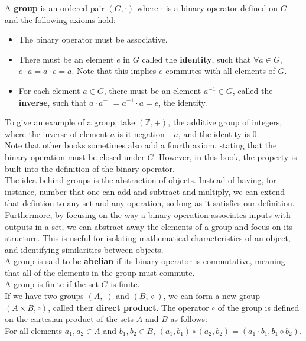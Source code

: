 \documentclass[12pt]{article}
\newcommand{\Z}{\mathbb{Z}}
\begin{document}
    A \textbf{group} is an ordered pair $(G, \cdot)$
    where $\cdot$ is a binary operator defined on $G$
    and the following axioms hold:
    \begin{itemize}[label=$\diamond$]
        \item 
            The binary operator must be associative.
        \item 
            There must be an element $e$ in $G$ called the \textbf{identity},
            such that $\forall a \in G$,
            $e \cdot a = a \cdot e = a$.
            Note that this implies $e$ commutes with all elements of $G$.
        \item
            For each element $a \in G$,
            there must be an element $a^{-1} \in G$,
            called the \textbf{inverse},
            such that $a \cdot a^{-1} = a^{-1} \cdot a = e$,
            the identity.
    \end{itemize}
    To give an example of a group,
    take $(\Z, +)$,
    the additive group of integers,
    where the inverse of element $a$ is it negation $-a$,
    and the identity is $0$. \\ 
    Note that other books sometimes also add a fourth axiom,
    stating that the binary operation must be closed under $G$.
    However, in this book, the property is built into the definition
    of the binary operator. \\

    The idea behind groups is the abstraction of objects.
    Instead of having, for instance,
    number that one can add and subtract and multiply,
    we can extend that defintion to any set and any operation,
    so long as it satisfies our definition. \\
    Furthermore,
    by focusing on the way a binary operation associates inputs
    with outputs in a set,
    we can abstract away the elements of a group and focus on its structure.
    This is useful for isolating mathematical characteristics of an object,
    and identifying similarities between objects. \\

    A group is said to be \textbf{abelian}
    if its binary operator is commutative,
    meaning that all of the elements in the group must commute. \\

    A group is finite if the set $G$ is finite. \\

    If we have two groups $(A, \cdot)$ and $(B, \diamond)$,
    we can form a new group $(A \times B, \circ)$,
    called their \textbf{direct product}.
    The operator $\circ$ of the group is defined on the cartesian product
    of the sets $A$ and $B$ as follows: \\ 
    For all elements $a_1, a_2 \in A$ and $b_1, b_2 \in B$,
    $(a_1, b_1) \circ (a_2, b_2) = (a_1 \cdot b_1, b_1 \diamond b_2)$. \\
\end{document}
